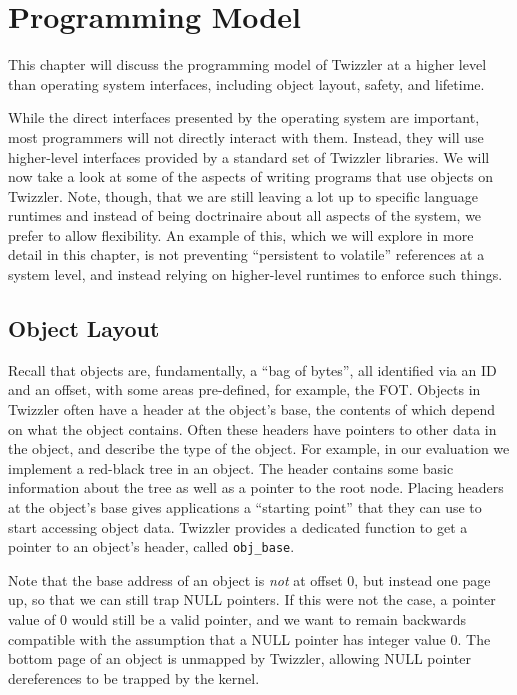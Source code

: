 
\chapter{Programming Model}\label{ch:prog}


\begin{chabstract}
    This chapter will discuss the programming model of Twizzler at a higher level than operating system interfaces,
    including object layout, safety, and lifetime.
\end{chabstract}

While the direct interfaces presented by the operating system are important, most programmers will not directly interact
with them. Instead, they will use higher-level interfaces provided by a standard set of Twizzler libraries. We will now
take a look at some of the aspects of writing programs that use objects on Twizzler. Note, though, that we are still
leaving a lot up to specific language runtimes and instead of being doctrinaire about all aspects of the system, we
prefer to allow flexibility. An example of this, which we will explore in more detail in this chapter, is not
preventing ``persistent to volatile'' references at a system level, and instead relying on higher-level runtimes to
enforce such things.

\section{Object Layout}
Recall that objects are, fundamentally, a ``bag of bytes'', all identified via an ID and an offset, with some areas
pre-defined, for example, the FOT.
Objects in Twizzler often have a header at the object's base, the contents of which depend on what
the object contains. Often these headers have pointers to other data in the object, and describe the
type of the object. For example, in our evaluation we implement a red-black tree in an object. The
header contains some basic information about the tree as well as a pointer to the root node. Placing
headers at the object's base gives applications a ``starting point'' that they can use to start
accessing object data. Twizzler provides a dedicated function to get a pointer to an object's
header, called \texttt{obj\_base}.

Note that the base address of an object is \emph{not} at offset $0$, but instead one page up, so that we
can still trap NULL pointers. If this were not the case, a pointer value of $0$ would still be a valid
pointer, and we want to remain backwards compatible with the assumption that a NULL pointer has
integer value $0$. The bottom page of an object is unmapped by Twizzler, allowing NULL pointer
dereferences to be trapped by the kernel.

